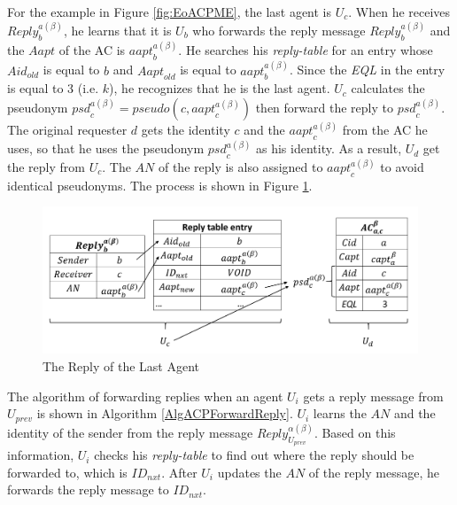 For the example in Figure \ref{fig:EoACPME}, the last agent is $U_c$. When he receives ${Reply}^{a\left(\beta\right)}_b$, he learns that it is $U_b$ who forwards the reply message ${Reply}^{a\left(\beta\right)}_b$ and the $Aapt$ of the AC is ${aapt}^{a\left(\beta\right)}_b$. He searches his \textit{reply-table} for an entry whose ${Aid}_{old}$ is equal to $b$ and ${Aapt}_{old}$ is equal to ${aapt}^{a\left(\beta\right)}_b$. Since the \textit{EQL} in the entry is equal to 3 (i.e. $k$), he recognizes that he is the last agent. $U_c$ calculates the pseudonym ${psd}^{a\left(\beta \right)}_c=pseudo\left(c,{aapt}^{a\left(\beta\right)}_c\right)$ then forward the reply to ${psd}^{a\left(\beta\right)}_c$. The original requester $d$ gets the identity $c$ and the ${aapt}^{a\left(\beta \right)}_c$ from the AC he uses, so that he uses the pseudonym ${psd}^{a\left(\beta \right)}_c$ as his identity. As a result, $U_d$ get the reply from $U_c$. The $AN$ of the reply is also assigned to ${aapt}^{a\left(\beta\right)}_c$ to avoid identical pseudonyms. The process is shown in Figure \ref{fig:ReplyOfLastAgent}. 

\begin{figure} [hbtp]
  \centering 
  \includegraphics[width=6.0in]{figures/FIG_4_9_The_Reply_of_the_Last_Agent.png}
  \caption{The Reply of the Last Agent} 
  \label{fig:ReplyOfLastAgent} %
\end{figure}

The algorithm of forwarding replies when an agent $U_i$ gets a reply message from $U_{prev}$ is shown in Algorithm \ref{AlgACPForwardReply}. $U_i$ learns the $AN$ and the identity of the sender from the reply message ${Reply}_{U_{prev}}^{\alpha\left(\beta\right)}$. Based on this information, $U_i$ checks his \textit{reply-table} to find out where the reply should be forwarded to, which is ${ID}_{nxt}$. After $U_i$ updates the $AN$ of the reply message, he forwards the reply message to ${ID}_{nxt}$.

